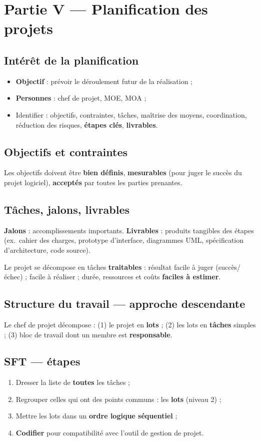 \documentclass[11pt,a4paper]{article}
\begin{document}
\section{Partie V — Planification des projets}

\subsection{Intérêt de la planification}
\begin{itemize}[nosep]
  \item \textbf{Objectif} : prévoir le déroulement futur de la réalisation ;
  \item \textbf{Personnes} : chef de projet, MOE, MOA ;
  \item Identifier : objectifs, contraintes, tâches, maîtrise des moyens, coordination, réduction des risques, \textbf{étapes clés}, \textbf{livrables}.
\end{itemize}

\subsection{Objectifs et contraintes}
Les objectifs doivent être \textbf{bien définis}, \textbf{mesurables} (pour juger le succès du projet logiciel), \textbf{acceptés} par toutes les parties prenantes.

\subsection{Tâches, jalons, livrables}
\textbf{Jalons} : accomplissements importants. \textbf{Livrables} : produits tangibles des étapes (ex.\ cahier des charges, prototype d'interface, diagrammes UML, spécification d'architecture, code source).

Le projet se décompose en tâches \textbf{traitables} : résultat facile à juger (succès/échec) ; facile à réaliser ; durée, ressources et coûts \textbf{faciles à estimer}.

\subsection{Structure du travail — approche descendante}
Le chef de projet décompose : (1) le projet en \textbf{lots} ; (2) les lots en \textbf{tâches} simples ; (3) bloc de travail dont un membre est \textbf{responsable}.

\subsection{SFT — étapes}
\begin{enumerate}[nosep]
  \item Dresser la liste de \textbf{toutes} les tâches ;
  \item Regrouper celles qui ont des points communs : les \textbf{lots} (niveau 2) ;
  \item Mettre les lots dans un \textbf{ordre logique séquentiel} ;
  \item \textbf{Codifier} pour compatibilité avec l'outil de gestion de projet.
\end{enumerate}
\end{document}
